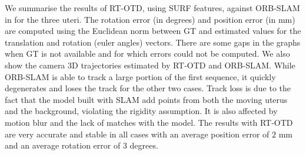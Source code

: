 We summarise the results of RT-OTD, using SURF features, against ORB-SLAM in  for the three uteri. The rotation error (in degrees) and position error (in mm) are computed using the Euclidean norm between GT and estimated values for the translation and rotation (euler angles) vectors. There are some gaps in the graphs when GT is not available and for which errors could not be computed. We also show the camera 3D trajectories estimated by RT-OTD and ORB-SLAM. While ORB-SLAM is able to track a large portion of the first sequence, it quickly degenerates and loses the track for the other two cases. Track loss is due to the fact that the model built with SLAM add points from both the moving uterus and the background, violating the rigidity assumption. It is also affected by motion blur and the lack of matches with the model. The results with RT-OTD are very accurate  and stable in all cases with an average position error of $2$ mm and an average rotation error of $3$ degrees.   
